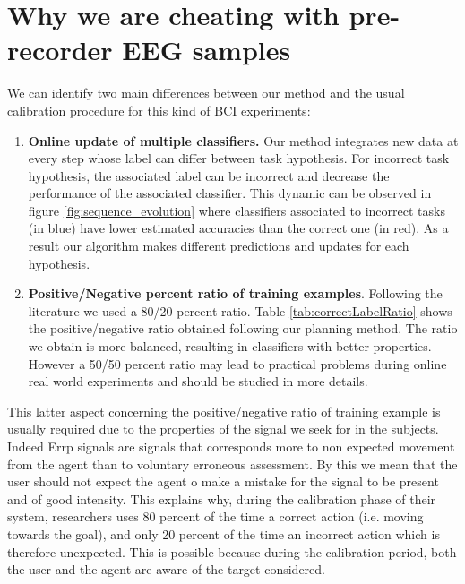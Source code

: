 \section{Why we are cheating with pre-recorder EEG samples}
\label{chapter:bci:cheating}

We can identify two main differences between our method and the usual calibration procedure for this kind of BCI experiments:
\begin{enumerate}
\item \textbf{Online update of multiple classifiers.} Our method integrates new data at every step whose label can differ between task hypothesis. For incorrect task hypothesis, the associated label can be incorrect and decrease the performance of the associated classifier. This dynamic can be observed in figure \ref{fig:sequence_evolution} where classifiers associated to incorrect tasks (in blue) have lower estimated accuracies than the correct one (in red). As a result our algorithm makes different predictions and updates for each hypothesis.
\item \textbf{Positive/Negative percent ratio of training examples}. Following the literature \cite{chavarriaga2010learning, iturrate2013task} we used a 80/20 percent ratio. Table \ref{tab:correctLabelRatio} shows the positive/negative ratio obtained following our planning method. The ratio we obtain is more balanced, resulting in classifiers with better properties. However a 50/50 percent ratio may lead to practical problems during online real world experiments and should be studied in more details.
\end{enumerate}

This latter aspect concerning the positive/negative ratio of training example is usually required due to the properties of the signal we seek for in the subjects. Indeed Errp signals are signals that corresponds more to non expected movement from the agent than to voluntary erroneous assessment. By this we mean that the user should not expect the agent o make a mistake for the signal to be present and of good intensity. This explains why, during the calibration phase of their system, researchers uses 80 percent of the time a correct action (i.e. moving towards the goal), and only 20 percent of the time an incorrect action which is therefore unexpected. This is possible because during the calibration period, both the user and the agent are aware of the target considered.

